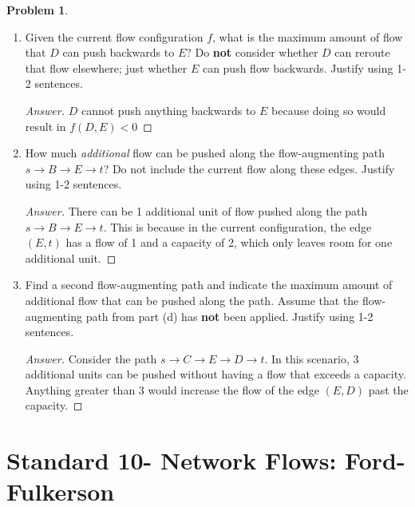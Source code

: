 \documentclass[11pt]{article}
\theoremstyle{definition}
\theoremstyle{definition}
\newtheorem{required}{Problem}
\theoremstyle{definition}
\begin{document}
\begin{required}
\begin{enumerate}[label=(\alph*)]
\vskip 10pt
\item Given the current flow configuration $f$, what is the maximum amount of flow that $D$ can push backwards to $E$? Do \textbf{not} consider whether $D$ can reroute that flow elsewhere; just whether $E$ can push flow backwards. Justify using 1-2 sentences.

\begin{proof}[Answer]
$D$ cannot push anything backwards to $E$ because doing so would result in $f(D,E) < 0$
\end{proof}


\vskip 10pt
\item How much \textit{additional} flow can be pushed along the flow-augmenting path $s \to B \to E \to t$? Do not include the current flow along these edges. Justify using 1-2 sentences.

\begin{proof}[Answer]
There can be 1 additional unit of flow pushed along the path $s \to B \to E \to t$. This is because in the current configuration, the edge $(E,t)$ has a flow of 1 and a capacity of 2, which only leaves room for one additional unit. 
\end{proof}


\vskip 10pt
\item Find a second flow-augmenting path and indicate the maximum amount of additional flow that can be pushed along the path. Assume that the flow-augmenting path from part (d) has \textbf{not} been applied. Justify using 1-2 sentences.

\begin{proof}[Answer]
Consider the path $s \to C \to E \to D \to t$. In this scenario, 3 additional units can be pushed without having a flow that exceeds a capacity. Anything greater than 3 would increase the flow of the edge $(E,D)$ past the capacity. 
\end{proof}
\end{enumerate}
\end{required}



\newpage
\section{Standard 10- Network Flows: Ford-Fulkerson}
\end{document}
